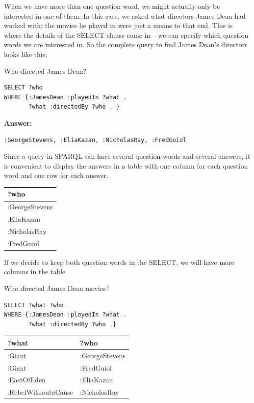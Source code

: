 When we have more than one question word, we might actually only be
interested in one of them. In this case, we asked what directors James
Dean had worked with; the movies he played in were just a means to that
end. This is where the details of the SELECT clause come in -- we can
specify which question words we are interested in. So the complete query
to find James Dean's directors looks like this:

\begin{query}Who directed James Dean?\end{query}

\begin{lstlisting}
SELECT ?who
WHERE {:JamesDean :playedIn ?what .
       ?what :directedBy ?who . }
\end{lstlisting}

\textbf{\textbf{Answer:}}

\begin{lstlisting}
:GeorgeStevens, :EliaKazan, :NicholasRay, :FredGuiol
\end{lstlisting}

Since a query in SPARQL can have several question words and several
answers, it is convenient to display the answers in a table with one
column for each question word and one row for each answer.

\begin{tabular}{|l|}
\hline
?who\\
\hline
:GeorgeStevens\\
:EliaKazan\\
:NicholasRay\\
:FredGuiol\\
\hline
\end{tabular}

If we decide to keep both question words in the SELECT, we will have
more columns in the table

\begin{query}Who directed James Dean movies?\end{query}

\begin{lstlisting}
SELECT ?what ?who
WHERE {:JamesDean :playedIn ?what .
       ?what :directedBy ?who .}
\end{lstlisting}

\begin{tabular}{| l l | }
\hline
?what&?who\\
\hline
:Giant&:GeorgeStevens\\
:Giant&:FredGuiol\\
:EastOfEden&:EliaKazan\\
:RebelWithoutaCause&:NicholasRay\\
\hline
\end{tabular}


